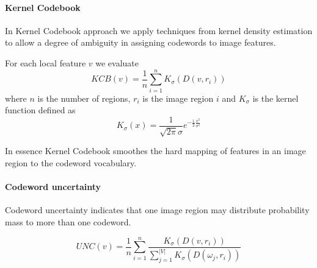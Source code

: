 \paragraph{Kernel Codebook}

In Kernel Codebook approach we apply techniques from kernel density estimation to allow a degree of ambiguity in assigning codewords to image features. 

For each local feature $v$ we evaluate
$$KCB(v) = \frac{1}{n} \sum_{i = 1}^{n} K_{\sigma}(D(v, r_i))$$
where $n$ is the number of regions, $r_i$ is the image region $i$ and $K_{\sigma}$ is the kernel function defined as
$$K_{\sigma} (x) = \frac{1}{\sqrt{2\pi} \sigma} e^{- \frac{1}{2} \frac{x^2}{\sigma^2}}$$

In essence Kernel Codebook smoothes the hard mapping of features in an image region to the codeword vocabulary.

\paragraph{Codeword uncertainty}

Codeword uncertainty indicates that one image region may distribute probability mass to more than one codeword.

$$UNC(v) = \frac{1}{n} \sum_{i = 1}^{n} \frac{K_{\sigma}(D(v, r_i))}{\sum_{j=1}^{|V|} K_{\sigma}(D(\omega_j, r_i))}$$
